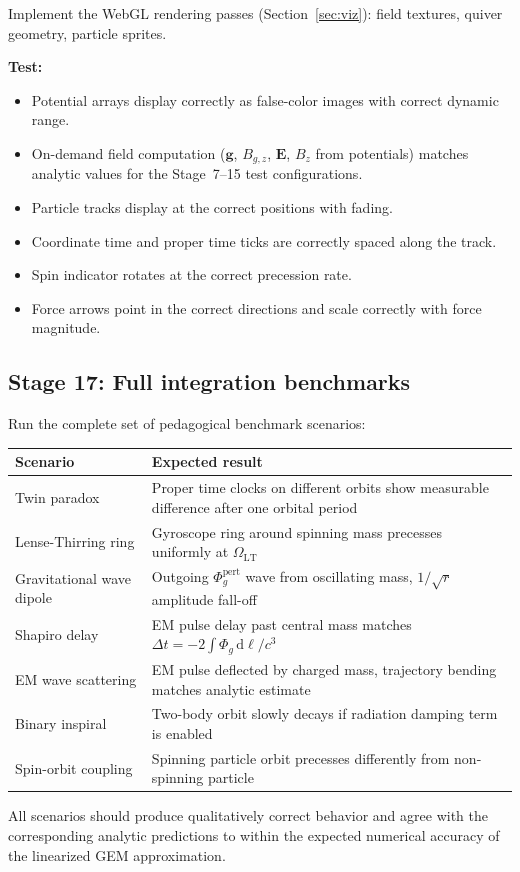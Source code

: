 \documentclass[11pt,a4paper]{article}
\newcommand{\vv}[1]{\mathbf{#1}}
\newcommand{\Phig}{\Phi_g}
\newcommand{\dd}{\mathrm{d}}
\begin{document}
Implement the WebGL rendering passes (Section~\ref{sec:viz}): field textures, quiver geometry, particle sprites.

\textbf{Test:}
\begin{itemize}
  \item Potential arrays display correctly as false-color images with correct dynamic range.
  \item On-demand field computation ($\vv{g}$, $B_{g,z}$, $\vv{E}$, $B_z$ from potentials) matches analytic values for the Stage~7--15 test configurations.
  \item Particle tracks display at the correct positions with fading.
  \item Coordinate time and proper time ticks are correctly spaced along the track.
  \item Spin indicator rotates at the correct precession rate.
  \item Force arrows point in the correct directions and scale correctly with force magnitude.
\end{itemize}

\subsection{Stage 17: Full integration benchmarks}

Run the complete set of pedagogical benchmark scenarios:

\begin{center}
\begin{tabular}{@{}L{4.5cm}L{7cm}@{}}
\toprule
\textbf{Scenario} & \textbf{Expected result} \\
\midrule
Twin paradox & Proper time clocks on different orbits show measurable difference after one orbital period \\
Lense-Thirring ring & Gyroscope ring around spinning mass precesses uniformly at $\Omega_{\mathrm{LT}}$ \\
Gravitational wave dipole & Outgoing $\Phig^{\mathrm{pert}}$ wave from oscillating mass, $1/\sqrt{r}$ amplitude fall-off \\
Shapiro delay & EM pulse delay past central mass matches $\Delta t = -2\int\Phig\,\dd\ell/c^3$ \\
EM wave scattering & EM pulse deflected by charged mass, trajectory bending matches analytic estimate \\
Binary inspiral & Two-body orbit slowly decays if radiation damping term is enabled \\
Spin-orbit coupling & Spinning particle orbit precesses differently from non-spinning particle \\
\bottomrule
\end{tabular}
\end{center}

All scenarios should produce qualitatively correct behavior and agree with the corresponding analytic predictions to within the expected numerical accuracy of the linearized GEM approximation.

\end{document}
